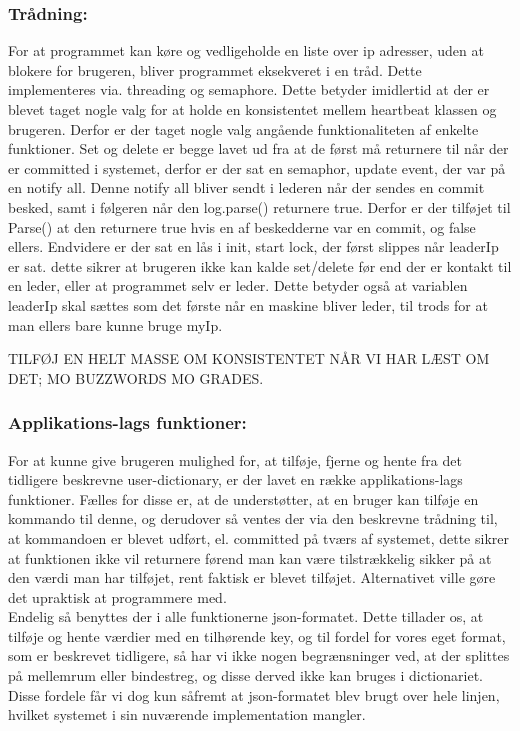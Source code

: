 \documentclass[a4paper,12pt]{article}
\begin{document}
\subsubsection{Trådning:}
For at programmet kan køre og vedligeholde en liste over ip adresser, uden at blokere for brugeren, bliver programmet eksekveret i en tråd. Dette implementeres via. threading og semaphore. Dette betyder imidlertid at der er blevet taget nogle valg for at holde en konsistentet mellem heartbeat klassen og brugeren. 
Derfor er der taget nogle valg angående funktionaliteten af enkelte funktioner.
Set og delete er begge lavet ud fra at de først må returnere til når der er committed i systemet, derfor er der sat en semaphor, update event, der var på en notify all. Denne notify all bliver sendt i lederen når der sendes en commit besked, samt i følgeren når den log.parse() returnere true. Derfor er der tilføjet til Parse() at den returnere true hvis en af beskedderne var en commit, og false ellers.
Endvidere er der sat en lås i init, start lock, der først slippes når leaderIp er sat. dette sikrer at brugeren ikke kan kalde set/delete før end der er kontakt til en leder, eller at programmet selv er leder.
Dette betyder også at variablen leaderIp skal sættes som det første når en maskine bliver leder, til trods for at man ellers bare kunne bruge myIp. 

TILFØJ EN HELT MASSE OM KONSISTENTET NÅR VI HAR LÆST OM DET; MO BUZZWORDS MO GRADES.



\subsubsection{Applikations-lags funktioner:}
For at kunne give brugeren mulighed for, at tilføje, fjerne og hente fra det tidligere beskrevne user-dictionary, er der lavet en række applikations-lags funktioner.
Fælles for disse er, at de understøtter, at en bruger kan tilføje en kommando til denne, og derudover så ventes der via den beskrevne trådning til, at kommandoen er blevet udført, el. committed på tværs af systemet, dette sikrer at funktionen ikke vil returnere førend man kan være tilstrækkelig sikker på at den værdi man har tilføjet, rent faktisk er blevet tilføjet. Alternativet ville gøre det upraktisk at programmere med.
\\
Endelig så benyttes der i alle funktionerne json-formatet. Dette tillader os, at tilføje og hente værdier med en tilhørende key, og til fordel for vores eget format, som er beskrevet tidligere, så har vi ikke nogen begrænsninger ved, at der splittes på mellemrum eller bindestreg, og disse derved ikke kan bruges i dictionariet. Disse fordele får vi dog kun såfremt at json-formatet blev brugt over hele linjen, hvilket systemet i sin nuværende implementation mangler.
\end{document}
